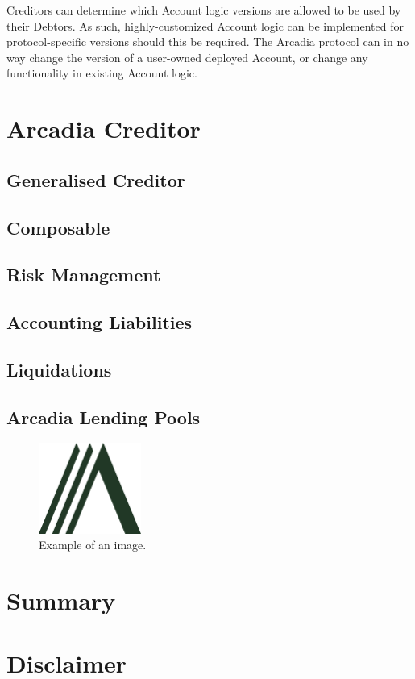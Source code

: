 \documentclass[sigconf,nonacm]{acmart}
\begin{document}
Creditors can determine which Account logic versions are allowed to be used by their Debtors.
As such, highly-customized Account logic can be implemented for protocol-specific versions should this be required. 
The Arcadia protocol can in no way change the version of a user-owned deployed Account, or change any functionality in existing Account logic.

\section{Arcadia Creditor}
\label{sec:arcadia-creditor}

\subsection{Generalised Creditor}

\subsection{Composable}

\subsection{Risk Management}

\subsection{Accounting Liabilities}

\subsection{Liquidations}

\lipsum[5]

\subsection{Arcadia Lending Pools}

\lipsum[6]

\begin{figure}
    \label{fig:arcadia-logo}
    \centering
    \includegraphics[width=0.3\textwidth]{images/Logo-Arcadia.png}
    \caption{Example of an image.}
  \end{figure}

\section{Summary}
\lipsum[7]




\section*{Disclaimer}
\lipsum[8]
\end{document}
